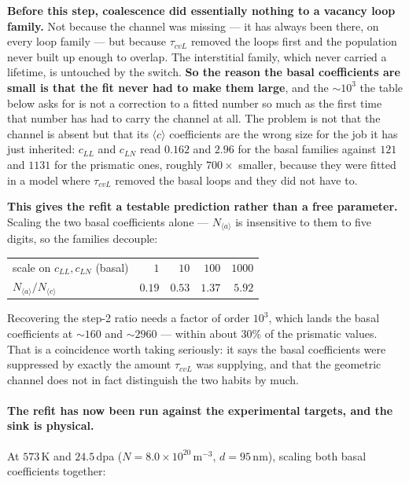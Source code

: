 \documentclass{article}
\newcommand{\cloop}{\ensuremath{\langle c\rangle}}
\begin{document}
\textbf{Before this step, coalescence did essentially nothing to a vacancy loop
family.} Not because the channel was missing --- it has always been there, on
every loop family --- but because $\tau_{cvL}$ removed the loops first and the
population never built up enough to overlap. The interstitial family, which
never carried a lifetime, is untouched by the switch. \textbf{So the reason the
basal coefficients are small is that the fit never had to make them large}, and
the $\sim\!10^3$ the table below asks for is not a correction to a fitted number
so much as the first time that number has had to carry the channel at all. The
problem is not that the channel is absent but that its
\cloop{} coefficients are the wrong size for the job it has just inherited:
$c_{LL}$ and $c_{LN}$ read $0.162$ and $2.96$ for the basal families against
$121$ and $1131$ for the prismatic ones, roughly $700\times$ smaller, because
they were fitted in a model where $\tau_{cvL}$ removed the basal loops and they
did not have to.

\textbf{This gives the refit a testable prediction rather than a free
parameter.} Scaling the two basal coefficients alone --- $N_{\langle a\rangle}$
is insensitive to them to five digits, so the families decouple:

\begin{center}\small
\begin{tabular}{@{}lrrrr@{}}
\toprule
scale on $c_{LL},c_{LN}$ (basal) & $1$ & $10$ & $100$ & $1000$\\
$N_{\langle a\rangle}/N_{\langle c\rangle}$ & $0.19$ & $0.53$ & $1.37$ & $5.92$\\
\bottomrule
\end{tabular}
\end{center}

Recovering the step-2 ratio needs a factor of order $10^{3}$, which lands the
basal coefficients at $\sim160$ and $\sim2960$ --- within about $30\%$ of the
prismatic values. That is a coincidence worth taking seriously: it says the
basal coefficients were suppressed by exactly the amount $\tau_{cvL}$ was
supplying, and that the geometric channel does not in fact distinguish the two
habits by much.

\paragraph{The refit has now been run against the experimental targets, and the
sink is physical.} At $573$\,K and $24.5$\,dpa ($N=8.0\times10^{20}\,$m$^{-3}$,
$d=95$\,nm), scaling both basal coefficients together:
\end{document}
